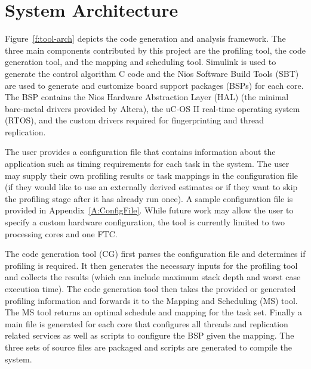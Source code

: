 
\chapter{System Architecture} %

\label{c:tool-arch} %


Figure~\ref{f:tool-arch} depicts the code generation and analysis framework. The three main components contributed by this project are the profiling tool, the code generation tool, and the mapping and scheduling tool. Simulink is used to generate the control algorithm C code and the Nios Software Build Tools (SBT) are used to generate and customize board support packages (BSPs) for each core. The BSP contains the Nios Hardware Abstraction Layer (HAL) (the minimal bare-metal drivers provided by Altera), the uC-OS II real-time operating system (RTOS), and the custom drivers required for fingerprinting and thread replication. 

 
The user provides a configuration file that contains information about the application such as timing requirements for each task in the system. The user may supply their own profiling results or task mappings in the configuration file (if they would like to use an externally derived estimates or if they want to skip the profiling stage after it has already run once). A sample configuration file is provided in Appendix~\ref{A:ConfigFile}. While future work may allow the user to specify a custom hardware configuration, the tool is currently limited to two processing cores and one FTC. 


The code generation tool (CG) first parses the configuration file and determines if profiling is required. It then generates the necessary inputs for the profiling tool and collects the results (which can include maximum stack depth and worst case execution time). The code generation tool then takes the provided or generated profiling information and forwards it to the Mapping and Scheduling (MS) tool. The MS tool returns an optimal schedule and mapping for the task set. Finally a main file is generated for each core that configures all threads and replication related services as well as scripts to configure the BSP given the mapping. The three sets of source files are packaged and scripts are generated to compile the system.